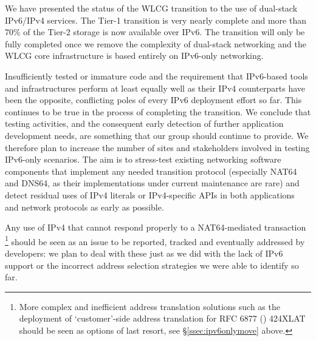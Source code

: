 
We have presented the status of the WLCG transition to the use of dual-stack IPv6/IPv4 services. The Tier-1 transition is very nearly complete and 
more than 70\% of the Tier-2 storage is now available over IPv6. The transition will only be fully completed once we remove the complexity of
dual-stack networking and the WLCG core infrastructure is based entirely on IPv6-only networking.


Insufficiently tested or immature code and the requirement that IPv6-based
tools and infrastructures perform at least equally well as their IPv4
counterparts have been the opposite, conflicting poles of every IPv6
deployment effort so far. This continues to be true in the process
of completing the transition. We conclude that
testing activities, and the consequent early detection of further application
development needs, are something that our group should continue to provide. We therefore plan
to increase the number of sites and stakeholders involved in testing IPv6-only 
scenarios. The aim is to stress-test existing networking software components
that implement any needed transition protocol (especially NAT64 and DNS64, as 
their implementations under current maintenance are rare) and detect
residual uses of IPv4 literals or IPv4-specific APIs in both applications and
network protocols as early as possible.\par
Any use of IPv4 that cannot respond properly to a NAT64-mediated
transaction
\footnote{More complex and inefficient address
translation solutions such as the deployment of `customer'-side address
translation for RFC 6877 (\cite{rfc}) 424XLAT should be
seen as options of last resort, see \S \ref{ssec:ipv6onlymove} above.}
should be seen as an issue to be reported, tracked and eventually
addressed by developers: we plan to deal with these just as we did
with the lack of IPv6 support or the incorrect address selection
strategies we were able to identify so far.
